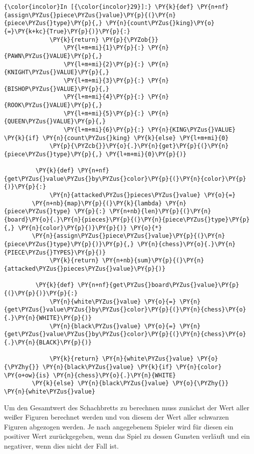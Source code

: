     \begin{Verbatim}[commandchars=\\\{\}]
{\color{incolor}In [{\color{incolor}29}]:} \PY{k}{def} \PY{n+nf}{assign\PYZus{}piece\PYZus{}value}\PY{p}{(}\PY{n}{piece\PYZus{}type}\PY{p}{,} \PY{n}{count\PYZus{}king}\PY{o}{=}\PY{k+kc}{True}\PY{p}{)}\PY{p}{:}
             \PY{k}{return} \PY{p}{\PYZob{}}
                 \PY{l+m+mi}{1}\PY{p}{:} \PY{n}{PAWN\PYZus{}VALUE}\PY{p}{,}
                 \PY{l+m+mi}{2}\PY{p}{:} \PY{n}{KNIGHT\PYZus{}VALUE}\PY{p}{,}
                 \PY{l+m+mi}{3}\PY{p}{:} \PY{n}{BISHOP\PYZus{}VALUE}\PY{p}{,}
                 \PY{l+m+mi}{4}\PY{p}{:} \PY{n}{ROOK\PYZus{}VALUE}\PY{p}{,}
                 \PY{l+m+mi}{5}\PY{p}{:} \PY{n}{QUEEN\PYZus{}VALUE}\PY{p}{,}
                 \PY{l+m+mi}{6}\PY{p}{:} \PY{n}{KING\PYZus{}VALUE} \PY{k}{if} \PY{n}{count\PYZus{}king} \PY{k}{else} \PY{l+m+mi}{0}
             \PY{p}{\PYZcb{}}\PY{o}{.}\PY{n}{get}\PY{p}{(}\PY{n}{piece\PYZus{}type}\PY{p}{,} \PY{l+m+mi}{0}\PY{p}{)}
             
         \PY{k}{def} \PY{n+nf}{get\PYZus{}value\PYZus{}by\PYZus{}color}\PY{p}{(}\PY{n}{color}\PY{p}{)}\PY{p}{:}
             \PY{n}{attacked\PYZus{}pieces\PYZus{}value} \PY{o}{=} 
		\PY{n+nb}{map}\PY{p}{(}\PY{k}{lambda} \PY{n}{piece\PYZus{}type} \PY{p}{:} \PY{n+nb}{len}\PY{p}{(}\PY{n}{board}\PY{o}{.}\PY{n}{pieces}\PY{p}{(}\PY{n}{piece\PYZus{}type}\PY{p}{,} \PY{n}{color}\PY{p}{)}\PY{p}{)} \PY{o}{*} 
		\PY{n}{assign\PYZus{}piece\PYZus{}value}\PY{p}{(}\PY{n}{piece\PYZus{}type}\PY{p}{)}\PY{p}{,} \PY{n}{chess}\PY{o}{.}\PY{n}{PIECE\PYZus{}TYPES}\PY{p}{)}
             \PY{k}{return} \PY{n+nb}{sum}\PY{p}{(}\PY{n}{attacked\PYZus{}pieces\PYZus{}value}\PY{p}{)}
         
         \PY{k}{def} \PY{n+nf}{get\PYZus{}board\PYZus{}value}\PY{p}{(}\PY{p}{)}\PY{p}{:}
             \PY{n}{white\PYZus{}value} \PY{o}{=} \PY{n}{get\PYZus{}value\PYZus{}by\PYZus{}color}\PY{p}{(}\PY{n}{chess}\PY{o}{.}\PY{n}{WHITE}\PY{p}{)}
             \PY{n}{black\PYZus{}value} \PY{o}{=} \PY{n}{get\PYZus{}value\PYZus{}by\PYZus{}color}\PY{p}{(}\PY{n}{chess}\PY{o}{.}\PY{n}{BLACK}\PY{p}{)}
             
             \PY{k}{return} \PY{n}{white\PYZus{}value} \PY{o}{\PYZhy{}} \PY{n}{black\PYZus{}value} \PY{k}{if} \PY{n}{color} \PY{o+ow}{is} \PY{n}{chess}\PY{o}{.}\PY{n}{WHITE} 
		\PY{k}{else} \PY{n}{black\PYZus{}value} \PY{o}{\PYZhy{}} \PY{n}{white\PYZus{}value}
\end{Verbatim}

    Um den Gesamtwert des Schachbretts zu berechnen muss zunächst der Wert
aller weißer Figuren berechnet werden und von diesem der Wert aller
schwarzen Figuren abgezogen werden. Je nach angegebenem Spieler wird für
diesen ein positiver Wert zurückgegeben, wenn das Spiel zu dessen
Gunsten verläuft und ein negativer, wenn dies nicht der Fall ist.

